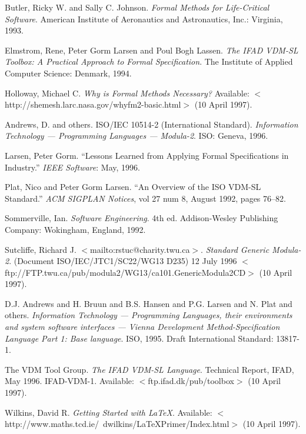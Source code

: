 \documentclass[11pt]{article}
\begin{document}
\newpage
\begin{thebibliography}{VDMSL}

Butler, Ricky W. and Sally C. Johnson.  {\em Formal Methods for Life-Critical Software}.  American Institute of Aeronautics and Astronautics, Inc.:  Virginia, 1993.

Elmstrom, Rene, Peter Gorm Larsen and Poul Bogh Lassen.  {\em The IFAD VDM-SL Toolbox:  A Practical Approach to Formal Specification}.  The Institute of Applied Computer Science:  Denmark, 1994.
 
Holloway, Michael C.  {\em Why is Formal Methods Necessary?}  Available: $<$http://shemesh.larc.nasa.gov/whyfm2-basic.html$>$ (10 April 1997).

Andrews, D. and others.  ISO/IEC 10514-2 (International Standard).  {\em Information Technology --- Programming Languages --- Modula-2}.  ISO: Geneva, 1996.

Larsen, Peter Gorm.  ``Lessons Learned from Applying Formal Specifications in Industry.''  {\em IEEE Software}:  May, 1996.

Plat, Nico and Peter Gorm Larsen.  ``An Overview of the ISO VDM-SL Standard.'' {\em ACM SIGPLAN Notices}, vol 27 num 8, August 1992, pages 76--82.

Sommerville, Ian.  {\em Software Engineering}. 4th ed.  Addison-Wesley Publishing Company:  Wokingham, England, 1992.

Sutcliffe, Richard J. $<$mailto:rstuc@charity.twu.ca$>$.  {\em Standard Generic Modula-2}.  (Document ISO/IEC/JTC1/SC22/WG13 D235) 12 July 1996 $<$ftp://FTP.twu.ca/pub/modula2/WG13/ca101.GenericModula2CD$>$ (10 April 1997). 

D.J. Andrews and H. Bruun and B.S. Hansen and P.G. Larsen and N. Plat and others.  {\em Information Technology --- Programming Languages, their environments and system software interfaces --- Vienna Development Method-Specification Language Part 1:  Base language}.  ISO, 1995.  Draft International Standard: 13817-1.

The VDM Tool Group.  {\em The IFAD VDM-SL Language}.  Technical Report, IFAD, May 1996.  IFAD-VDM-1.  Available: $<$ftp.ifad.dk/pub/toolbox$>$ (10 April 1997).

Wilkins, David R.  {\em Getting Started with \LaTeX}.  Available: $<$http://www.maths.tcd.ie/~dwilkins/LaTeXPrimer/Index.html$>$ (10 April 1997).

\end {thebibliography}

\newpage
\appendix

\end{document}
